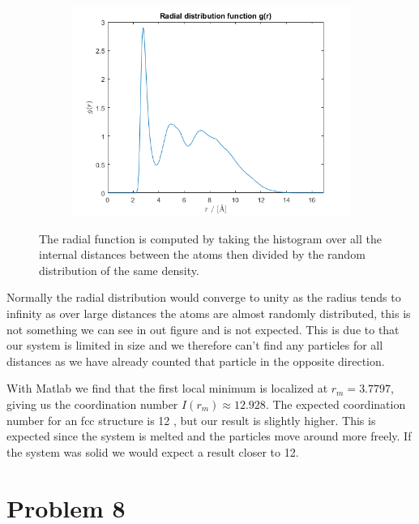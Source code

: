 \begin{figure}[H]
\centering
\captionsetup[subfigure]{justification=centering}
\begin{subfigure}[b]{0.40\textwidth}
	\centering
	\includegraphics[width=\textwidth]{graphics/task7/radial.png}
\end{subfigure}
\caption{The radial function is computed by taking the histogram over all the internal distances between the atoms then divided by the random distribution of the same density.}
\label{fig:radial}
\end{figure}

Normally the radial distribution would converge to unity as the radius tends to infinity as over large distances the atoms are almost randomly distributed, this is not something we can see in out figure and is not expected. This is due to that our system is limited in size and we therefore can't find any particles for all distances as we have already counted that particle in the opposite direction.

With Matlab we find that the first local minimum is localized at $r_m = 3.7797$, giving us the coordination number $I(r_m) \approx 12.928$. The expected coordination number for an fcc structure is 12 \cite{al_coordination_nbr}, but our result is slightly higher. This is expected since the system is melted and the particles move around more freely. If the system was solid we would expect a result closer to 12.

\section*{Problem 8}

